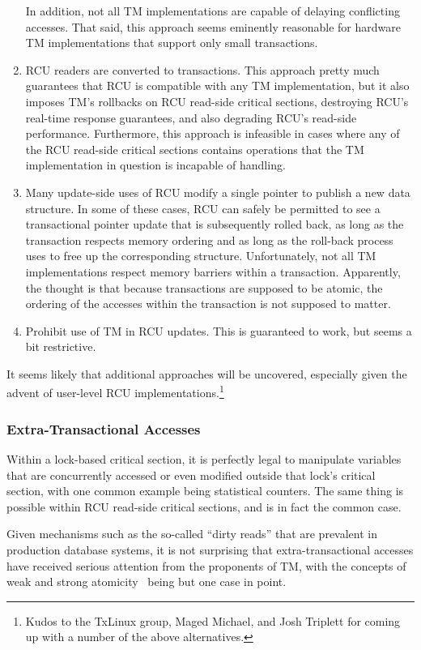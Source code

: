 \begin{enumerate}
	In addition, not all TM implementations are capable of delaying
	conflicting accesses.
	That said, this approach seems eminently reasonable for hardware
	TM implementations that support only small transactions.
\item	RCU readers are converted to transactions.
	This approach pretty much guarantees that RCU is compatible with
	any TM implementation, but it also imposes TM's rollbacks on RCU
	read-side critical sections, destroying RCU's real-time response
	guarantees, and also degrading RCU's read-side performance.
	Furthermore, this approach is infeasible in cases where any of
	the RCU read-side critical sections contains operations that
	the TM implementation in question is incapable of handling.
\item	Many update-side uses of RCU modify a single pointer to publish
	a new data structure.
	In some of these cases, RCU can safely be permitted to see a
	transactional pointer update that is subsequently rolled back,
	as long as the transaction respects memory ordering and as long
	as the roll-back process uses  to free up the
	corresponding structure.
	Unfortunately, not all TM implementations respect memory barriers
	within a transaction.
	Apparently, the thought is that because transactions are supposed
	to be atomic, the ordering of the accesses within the transaction
	is not supposed to matter.
\item	Prohibit use of TM in RCU updates.
	This is guaranteed to work, but seems a bit restrictive.
\end{enumerate}

It seems likely that additional approaches will be uncovered, especially
given the advent of user-level RCU implementations.\footnote{
	Kudos to the TxLinux group, Maged Michael, and Josh Triplett
	for coming up with a number of the above alternatives.}

\subsubsection{Extra-Transactional Accesses}
\label{sec:future:Extra-Transactional Accesses}

Within a lock-based critical section, it is perfectly legal to manipulate
variables that are concurrently accessed or even modified outside that
lock's critical section, with one common example being statistical
counters.
The same thing is possible within RCU read-side critical
sections, and is in fact the common case.

Given mechanisms such as the so-called ``dirty reads'' that are
prevalent in production database systems, it is not surprising
that extra-transactional accesses have received serious attention
from the proponents of TM, with the concepts of weak and strong
atomicity~\cite{Blundell2006TMdeadlock} being but one case in point.

